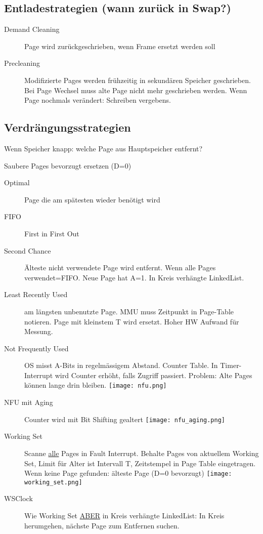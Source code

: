 \begin{multicols*}{4}
\subsection{Entladestrategien (wann zurück in Swap?)}
\begin{description}
    \item[Demand Cleaning] Page wird zurückgeschrieben, wenn Frame ersetzt werden soll
    \item[Precleaning] Modifizierte Pages werden frühzeitig in sekundären Speicher geschrieben.
    Bei Page Wechsel muss alte Page nicht mehr geschrieben werden. Wenn Page nochmals verändert: Schreiben vergebens.
\end{description}

\subsection{Verdrängungsstrategien}
Wenn Speicher knapp: welche Page aus Hauptspeicher entfernt?

Saubere Pages bevorzugt ersetzen (D=0)

\begin{description}
    \item[Optimal] Page die am spätesten wieder benötigt wird
    \item[FIFO] First in First Out
    \item[Second Chance] Älteste nicht verwendete Page wird entfernt. Wenn alle Pages verwendet=FIFO. Neue Page hat A=1. In Kreis verhängte LinkedList.
    \item[Least Recently Used] am längsten unbenutzte Page. MMU muss Zeitpunkt in Page-Table notieren. Page mit kleinstem T wird ersetzt. Hoher HW Aufwand für Messung.
    \item[Not Frequently Used] OS misst A-Bits in regelmässigem Abstand. Counter Table. In Timer-Interrupt wird Counter erhöht, falls Zugriff passiert. Problem: Alte Pages können lange drin bleiben.  \texttt{[image: nfu.png]}
    \item[NFU mit Aging] Counter wird mit Bit Shifting gealtert \texttt{[image: nfu\_aging.png]}
    \item[Working Set] Scanne \underline{alle} Pages in Fault Interrupt. Behalte Pages von aktuellem Working Set, Limit für Alter ist Intervall T, Zeitstempel in Page Table eingetragen. Wenn keine Page gefunden: älteste Page (D=0 bevorzugt)
    \texttt{[image: working\_set.png]}
    \item[WSClock] Wie Working Set \underline{ABER} in Kreis verhängte LinkedList: In Kreis herumgehen, nächste Page zum Entfernen suchen.
\end{description}


\end{multicols*}
